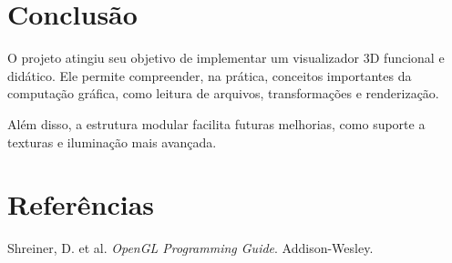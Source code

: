 \documentclass[12pt,a4paper]{article}
\begin{document}
\section{Conclusão}

O projeto atingiu seu objetivo de implementar um visualizador 3D funcional e didático. Ele permite compreender, na prática, conceitos importantes da computação gráfica, como leitura de arquivos, transformações e renderização.

Além disso, a estrutura modular facilita futuras melhorias, como suporte a texturas e iluminação mais avançada.

\section{Referências}

Shreiner, D. et al. \textit{OpenGL Programming Guide}. Addison-Wesley.
\end{document}
